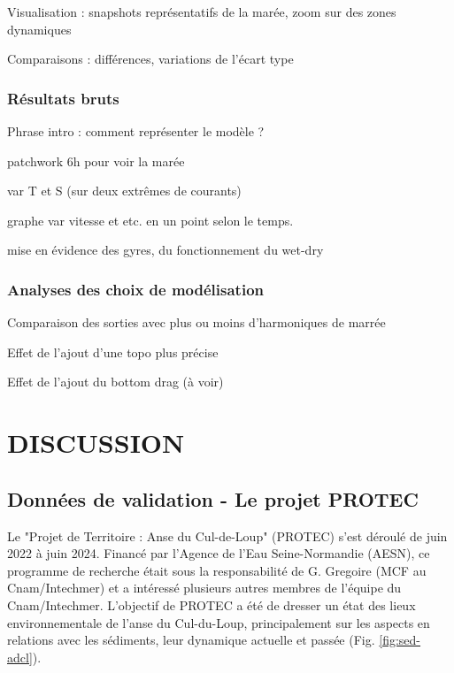 \documentclass[10pt,a4paper,titlepage]{article}
\begin{document}
Visualisation : snapshots représentatifs de la marée, zoom sur des zones dynamiques

Comparaisons : différences, variations de l'écart type

\subsubsection{Résultats bruts}
Phrase intro : comment représenter le modèle ?

patchwork 6h pour voir la marée

var T et S (sur deux extrêmes de courants)

graphe var vitesse et etc. en un point selon le temps.

mise en évidence des gyres, du fonctionnement du wet-dry

\subsubsection{Analyses des choix de modélisation}
Comparaison des sorties avec plus ou moins d'harmoniques de marrée

Effet de l'ajout d'une topo plus précise

Effet de l'ajout du bottom drag (à voir)

\newpage

\section{DISCUSSION}
\label{sec:discussion}



\subsection{Données de validation - Le projet PROTEC}
\label{subsub:protec}

Le "Projet de Territoire : Anse du Cul-de-Loup" (PROTEC) s'est déroulé de juin 2022 à juin 2024. Financé par l'Agence de l'Eau Seine-Normandie (AESN), ce programme de recherche était sous la responsabilité de G. Gregoire (MCF au Cnam/Intechmer) et a intéressé plusieurs autres membres de l'équipe du Cnam/Intechmer. L'objectif de PROTEC a été de dresser un état des lieux environnementale de l'anse du Cul-du-Loup, principalement sur les aspects en relations avec les sédiments, leur dynamique actuelle et passée (Fig. \ref{fig:sed-adcl}).
\end{document}
